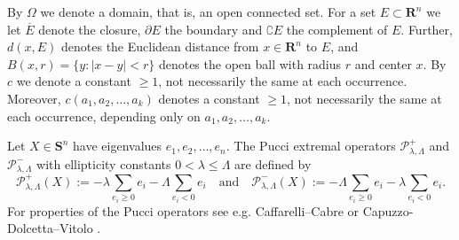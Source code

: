 \documentclass[12pt]{article}
\numberwithin{komcounter}{section}
\begin{document}
By $\Omega$ we denote a domain, that is, an open connected set.
For a set $E \subset \mathbf{R}^n$
we let $\overline{E}$ denote the closure,
$\partial E$ the boundary and
$\complement E$ the complement of $E$. %
Further, $d(x,E)$ denotes the Euclidean distance from $x \in \mathbf{R}^n$ to $E$, and
$B(x,r) = \{ y : | x  -  y | < r \}$
denotes the open ball with radius $r$ and center $x$.
By $c$ we denote a constant $\geq 1$, not necessarily the same at each occurrence.
Moreover, $c(a_1, a_2, \dots, a_k)$ denotes a constant $\geq 1$, not necessarily the same at each occurrence,
depending only on $a_1, a_2, \dots, a_k$.


Let $X \in \mathbf{S}^n$ have eigenvalues $e_1,e_2, \dots ,e_n$.
The Pucci extremal operators $\mathcal{P}^+_{\lambda,\Lambda}$ and $\mathcal{P}^-_{\lambda,\Lambda}$ with ellipticity constants $0 < \lambda \leq \Lambda$ are defined by
%
$$
\mathcal{P}^+_{\lambda,\Lambda}(X) := - \lambda \sum_{e_i \geq 0} e_i - \Lambda\sum_{e_i < 0} e_i \quad \text{and} \quad \mathcal{P}^-_{\lambda,\Lambda}(X) := - \Lambda \sum_{e_i \geq 0} e_i - \lambda \sum_{e_i < 0} e_i.
$$
%
For properties of the Pucci operators see e.g. Caffarelli--Cabre \cite{CC95} or Capuzzo-Dolcetta--Vitolo \cite{CV07}.
\end{document}
